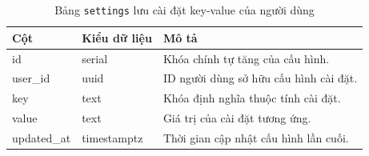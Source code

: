 \begin{table}[H]
\centering
\begin{tabular}{|l|l|p{6cm}|}
\hline
\textbf{Cột} & \textbf{Kiểu dữ liệu} & \textbf{Mô tả} \\ \hline
id & serial & Khóa chính tự tăng của cấu hình. \\ \hline
user\_id & uuid & ID người dùng sở hữu cấu hình cài đặt. \\ \hline
key & text & Khóa định nghĩa thuộc tính cài đặt. \\ \hline
value & text & Giá trị của cài đặt tương ứng. \\ \hline
updated\_at & timestamptz & Thời gian cập nhật cấu hình lần cuối. \\ \hline
\end{tabular}
\caption{Bảng \texttt{settings} lưu cài đặt key-value của người dùng}
\end{table}

